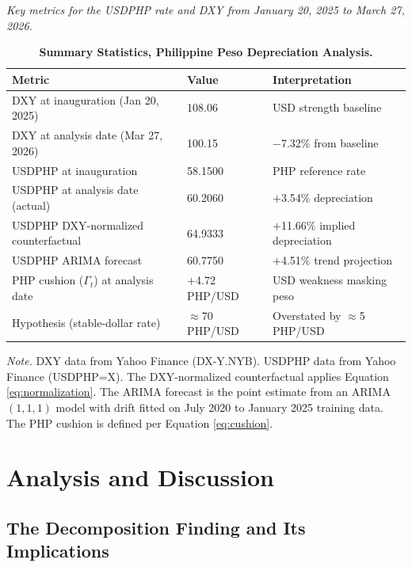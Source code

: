 \documentclass[12pt]{article}
\begin{document}
\begin{table}[H]
  \centering
  \caption{\textbf{Summary Statistics, Philippine Peso Depreciation Analysis.}}
  \vspace{6pt}
  \textit{Key metrics for the USDPHP rate and DXY from January 20, 2025 to March 27, 2026.}
  \vspace{6pt}
  \begin{tabular}{lll}
    \toprule
    \textbf{Metric} & \textbf{Value} & \textbf{Interpretation} \\
    \midrule
    DXY at inauguration (Jan 20, 2025) & 108.06 & USD strength baseline \\
    DXY at analysis date (Mar 27, 2026) & 100.15 & $-$7.32\% from baseline \\
    USDPHP at inauguration & 58.1500 & PHP reference rate \\
    USDPHP at analysis date (actual) & 60.2060 & $+$3.54\% depreciation \\
    USDPHP DXY-normalized counterfactual & 64.9333 & $+$11.66\% implied depreciation \\
    USDPHP ARIMA forecast & 60.7750 & $+$4.51\% trend projection \\
    PHP cushion ($\Gamma_t$) at analysis date & $+$4.72 PHP/USD & USD weakness masking peso \\
    Hypothesis (stable-dollar rate) & $\approx$70 PHP/USD & Overstated by $\approx$5 PHP/USD \\
    \bottomrule
  \end{tabular}
  \vspace{4pt}

  \noindent\textit{Note.} DXY data from Yahoo Finance (DX-Y.NYB). USDPHP data from Yahoo Finance
  (USDPHP=X). The DXY-normalized counterfactual applies Equation \ref{eq:normalization}.
  The ARIMA forecast is the point estimate from an ARIMA$(1,1,1)$ model with drift
  fitted on July 2020 to January 2025 training data. The PHP cushion is defined per
  Equation \ref{eq:cushion}.
  \label{tab:summary}
\end{table}

\section{Analysis and Discussion}

\subsection{The Decomposition Finding and Its Implications}
\end{document}
